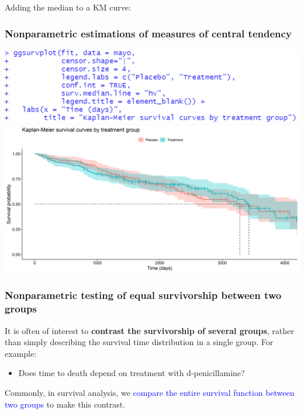 \documentclass[10pt,t]{beamer}
\begin{document}
\begin{frame}
	\vspace{-0.5cm}
	Adding the median to a KM curve:
	\frametitle{Nonparametric estimations of measures of central tendency} 
	\begin{center}
		\includegraphics[height=0.3\textheight]{figs/KM_strat_medians_code.png}
		\includegraphics[width=\textwidth]{figs/KM_strat_medians.png}
	\end{center}
\end{frame}

\begin{frame}
\frametitle{Nonparametric testing of equal survivorship between two groups}

It is often of interest to \textbf{contrast the survivorship of several groups}, rather than simply describing the survival time distribution in a single group. For example:
\begin{itemize}
\item Does time to death depend on treatment with d-penicillamine? 
\end{itemize}

Commonly, in survival analysis, we \textcolor{blue}{compare the entire survival function between two groups} to make this contrast.
\end{frame}
\end{document}
